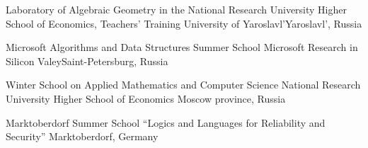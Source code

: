 \documentclass[11pt,a4paper]{moderncv}   %
\newcommand{\MyHrefImpl}[2]{%
\textcolor{blue}{\href{#1}{#2}}}
\def\LINKS{}
\newcommand*{\myhref}[2]{%
\ignorespaces%
\ifdefined\LINKS%
\MyHrefImpl{#1}{#2}%
\else%
#2%
\fi%
}
\begin{document}
      {Laboratory of Algebraic Geometry in the National Research University Higher School of Economics, Teachers' Training University of Yaroslavl'}{Yaroslavl', Russia}%
      {}%
      {%
      }

      {Microsoft Algorithms and Data Structures Summer School}%
      {Microsoft Research in Silicon Valey}{Saint-Petersburg, Russia}{}%
      {%
      }

      {Winter School on Applied Mathematics and Computer Science}%
      {National Research University Higher School of Economics}%
      {Moscow province, Russia}{}%
      {%
      }

      {Marktoberdorf Summer School “Logics and Languages for Reliability and Security”}%
      {}{Marktoberdorf, Germany}{}%
      {%
      }





\end{document}
